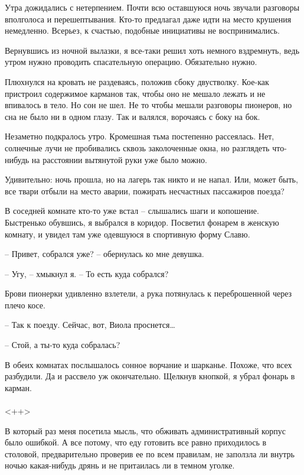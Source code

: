 \documentclass[a4paper]{book}
\begin{document}
Утра дожидались с нетерпением. Почти всю оставшуюся ночь звучали разговоры вполголоса и перешептывания. Кто-то предлагал даже идти на место крушения немедленно. Всерьез, к счастью, подобные инициативы не воспринимались.

Вернувшись из ночной вылазки, я все-таки решил хоть немного вздремнуть, ведь утром нужно проводить спасательную операцию. Обязательно нужно. 

Плюхнулся на кровать не раздеваясь, положив сбоку двустволку. Кое-как пристроил содержимое карманов так, чтобы оно не мешало лежать и не впивалось в тело. Но сон  не шел. Не то чтобы мешали разговоры пионеров, но сна не было ни в одном глазу. Так и валялся, ворочаясь с боку на бок.

Незаметно подкралось утро. Кромешная тьма постепенно рассеялась. Нет, солнечные лучи не пробивались сквозь заколоченные окна, но разглядеть что-нибудь на расстоянии вытянутой руки уже было можно.

Удивительно: ночь прошла, но на лагерь так никто и не напал. Или, может быть, все твари отбыли на место аварии, пожирать несчастных пассажиров поезда?

В соседней комнате кто-то уже встал -- слышались шаги и копошение. Быстренько обувшись, я выбрался в коридор. Посветил фонарем в женскую комнату, и увидел там уже одевшуюся в спортивную форму Славю.

-- Привет, собрался уже? -- обернулась ко мне девушка.

-- Угу, -- хмыкнул я. -- То есть куда собрался?

Брови пионерки удивленно взлетели, а рука потянулась к переброшенной через плечо косе. 

-- Так к поезду. Сейчас, вот, Виола проснется\ldots

-- Стой, а ты-то куда собралась?

В обеих комнатах послышалось сонное ворчание и шарканье. Похоже, что всех разбудили. Да и рассвело уж окончательно. Щелкнув кнопкой, я убрал фонарь в карман.

\paragraph{}<++>

В который раз меня посетила мысль, что обживать административный корпус было ошибкой. А все потому, что еду готовить все равно приходилось в столовой, предварительно проверив ее по всем правилам, не заползла ли внутрь ночью какая-нибудь дрянь и не притаилась ли в темном уголке. 
\end{document}

